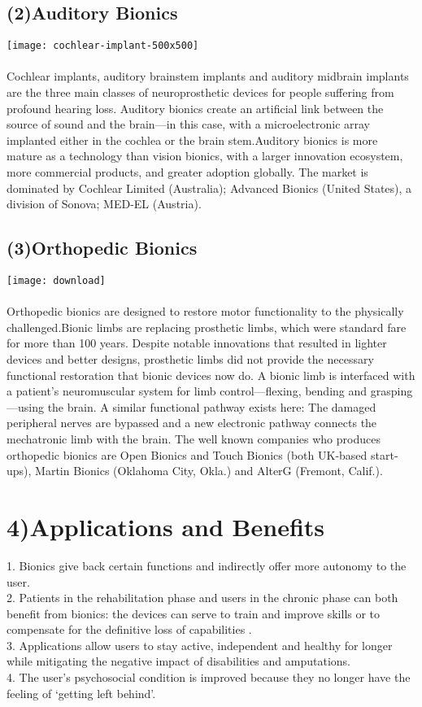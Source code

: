 \documentclass{report}
\begin{document}
\subsection*{(2)Auditory Bionics}
\texttt{[image: cochlear-implant-500x500]}\\~\\
Cochlear implants, auditory brainstem implants and auditory midbrain implants are the three main classes of neuroprosthetic devices for people suffering from profound hearing loss. Auditory bionics create an artificial link between the source of sound and the brain—in this case, with a microelectronic array implanted either in the cochlea or the brain stem.Auditory bionics is more mature as a technology than vision bionics, with a larger innovation ecosystem, more commercial products, and greater adoption globally. The market is dominated by Cochlear Limited (Australia); Advanced Bionics (United States), a division of Sonova; MED-EL (Austria).
\subsection*{(3)Orthopedic Bionics}
\texttt{[image: download]}\\~\\
Orthopedic bionics are designed to restore motor functionality to the physically challenged.Bionic limbs are replacing prosthetic limbs, which were standard fare for more than 100 years. Despite notable innovations that resulted in lighter devices and better designs, prosthetic limbs did not provide the necessary functional restoration that bionic devices now do. A bionic limb is interfaced with a patient’s neuromuscular system for limb control—flexing, bending and grasping—using the brain. A similar functional pathway exists here: The damaged peripheral nerves are bypassed and a new electronic pathway connects the mechatronic limb with the brain. The well known companies who produces orthopedic bionics are Open Bionics and Touch Bionics (both UK-based start-ups), Martin Bionics (Oklahoma City, Okla.) and AlterG (Fremont, Calif.).
\section*{4)Applications and Benefits}
1. Bionics give back certain functions and indirectly offer more autonomy to the user. \\
2. Patients in the rehabilitation phase and users in the chronic phase can both benefit from bionics: the devices can serve to train and improve skills or to compensate for the definitive loss of capabilities .\\ 
3. Applications allow users to stay active, independent and healthy for longer while mitigating the negative impact of disabilities and amputations. \\
4. The user’s psychosocial condition is improved because they no longer have the feeling of ‘getting left behind’.
\end{document}

